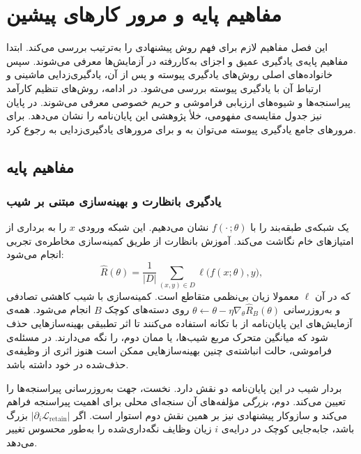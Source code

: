 \chapter{مفاهیم پایه و مرور کارهای پیشین}
\label{ch:literature}

این فصل مفاهیم لازم برای فهم روش پیشنهادی را به‌ترتیب بررسی می‌کند. ابتدا مفاهیم پایه‌ی یادگیری عمیق و اجزای به‌کاررفته در آزمایش‌ها معرفی می‌شوند. سپس خانواده‌های اصلی روش‌های یادگیری پیوسته و پس از آن، یادگیری‌زدایی ماشینی و ارتباط آن با یادگیری پیوسته بررسی می‌شود. در ادامه، روش‌های تنظیم کارآمد پیراسنجه‌ها و شیوه‌های ارزیابی فراموشی و حریم خصوصی معرفی می‌شوند. در پایان نیز جدول مقایسه‌ی مفهومی، خلأ پژوهشی این پایان‌نامه را نشان می‌دهد. برای مرورهای جامع یادگیری پیوسته می‌توان به \cite{parisi2019continual,delange2022survey,vandeven2022three,wang2023continualsurvey} و برای مرورهای یادگیری‌زدایی به \cite{nguyen2022unlearningsurvey,xu2023unlearningsurvey} رجوع کرد.

\section{مفاهیم پایه}
\label{sec:lit-basics}

\subsection{یادگیری بانظارت و بهینه‌سازی مبتنی بر شیب}
\label{subsec:lit-sgd}

یک شبکه‌ی طبقه‌بند را با $f(\cdot\,;\theta)$ نشان می‌دهیم. این شبکه ورودی $x$ را به برداری از {امتیازهای خام} نگاشت می‌کند. آموزش بانظارت از طریق کمینه‌سازی {مخاطره‌ی تجربی} انجام می‌شود:
\begin{equation}
	\label{eq:erm}
	\widehat{R}(\theta)=\frac{1}{|D|}\sum_{(x,y)\in D}\ell\big(f(x;\theta),y\big),
\end{equation}
که در آن $\ell$ معمولا زیان {بی‌نظمی متقاطع} است. کمینه‌سازی با {شیب کاهشی تصادفی} \cite{robbins1951sgd} و به‌روزرسانی $\theta\!\leftarrow\!\theta-\eta\nabla_\theta\widehat{R}_{B}(\theta)$ روی دسته‌های کوچک $B$ انجام می‌شود. همه‌ی آزمایش‌های این پایان‌نامه از  با تکانه استفاده می‌کنند تا اثر تطبیقی بهینه‌سازهایی حذف شود که میانگین متحرک مربع شیب‌ها، یا ممان دوم، را نگه می‌دارند. در مسئله‌ی فراموشی، {حالت انباشته‌ی} چنین بهینه‌سازهایی ممکن است هنوز اثری از وظیفه‌ی حذف‌شده در خود داشته باشد.

بردار شیب در این پایان‌نامه دو نقش دارد. نخست، جهت به‌روزرسانی پیراسنجه‌ها را تعیین می‌کند. دوم، \emph{بزرگی} مؤلفه‌های آن سنجه‌ای محلی برای {اهمیت پیراسنجه} فراهم می‌کند و سازوکار پیشنهادی نیز بر همین نقش دوم استوار است. اگر $|\partial_i \mathcal{L}_{\mathrm{retain}}|$ بزرگ باشد، جابه‌جایی کوچک در درایه‌ی $i$ زیان وظایف نگه‌داری‌شده را به‌طور محسوس تغییر می‌دهد.


